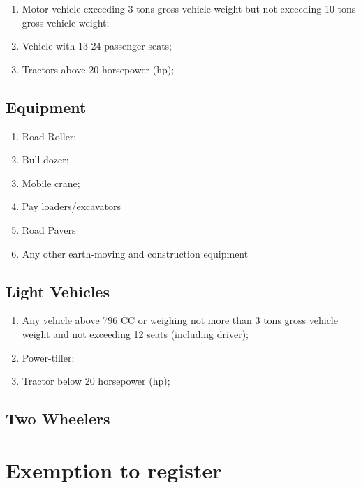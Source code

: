\documentclass[
]{book}
\providecommand{\tightlist}{%
  \setlength{\itemsep}{0pt}\setlength{\parskip}{0pt}}
\begin{document}
\begin{enumerate}
\def\labelenumi{\alph{enumi}.}
\tightlist
\item
  Motor vehicle exceeding 3 tons gross vehicle weight but not exceeding 10 tons gross vehicle weight;
\item
  Vehicle with 13-24 passenger seats;
\item
  Tractors above 20 horsepower (hp);
\end{enumerate}

\hypertarget{equipment}{%
\subsection{Equipment}\label{equipment}}

\begin{enumerate}
\def\labelenumi{\alph{enumi}.}
\tightlist
\item
  Road Roller;
\item
  Bull-dozer;
\item
  Mobile crane;
\item
  Pay loaders/excavators
\item
  Road Pavers
\item
  Any other earth-moving and construction equipment
\end{enumerate}

\hypertarget{light-vehicles}{%
\subsection{Light Vehicles}\label{light-vehicles}}

\begin{enumerate}
\def\labelenumi{\alph{enumi}.}
\tightlist
\item
  Any vehicle above 796 CC or weighing not more than 3 tons gross vehicle weight and not exceeding 12 seats (including driver);
\item
  Power-tiller;
\item
  Tractor below 20 horsepower (hp);
\end{enumerate}

\hypertarget{two-wheelers}{%
\subsection{Two Wheelers}\label{two-wheelers}}

\hypertarget{exemption-to-register}{%
\section{Exemption to register}\label{exemption-to-register}}
\end{document}
